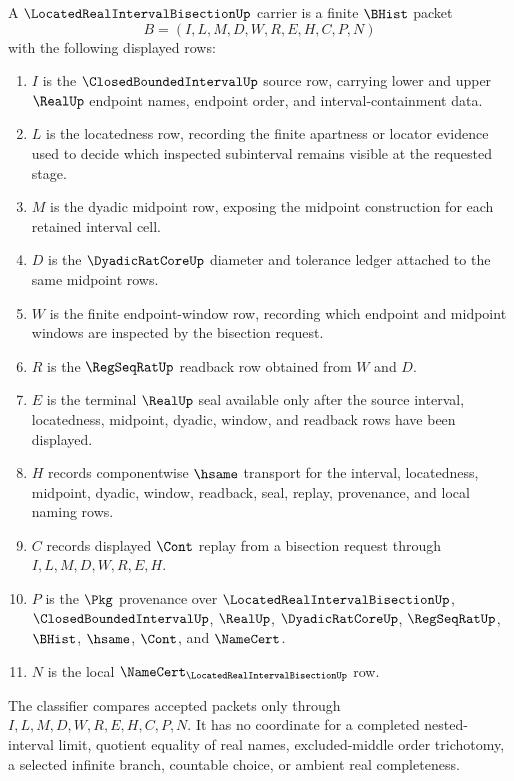 \begin{definition}
\label{def:located-real-interval-bisection-carrier}
A $\LocatedRealIntervalBisectionUp$ carrier is a finite $\BHist$ packet
$$
B=(I,L,M,D,W,R,E,H,C,P,N)
$$
with the following displayed rows:
\begin{enumerate}
\item $I$ is the $\ClosedBoundedIntervalUp$ source row, carrying lower and upper $\RealUp$ endpoint names, endpoint order, and interval-containment data.
\item $L$ is the locatedness row, recording the finite apartness or locator evidence used to decide which inspected subinterval remains visible at the requested stage.
\item $M$ is the dyadic midpoint row, exposing the midpoint construction for each retained interval cell.
\item $D$ is the $\DyadicRatCoreUp$ diameter and tolerance ledger attached to the same midpoint rows.
\item $W$ is the finite endpoint-window row, recording which endpoint and midpoint windows are inspected by the bisection request.
\item $R$ is the $\RegSeqRatUp$ readback row obtained from $W$ and $D$.
\item $E$ is the terminal $\RealUp$ seal available only after the source interval, locatedness, midpoint, dyadic, window, and readback rows have been displayed.
\item $H$ records componentwise $\hsame$ transport for the interval, locatedness, midpoint, dyadic, window, readback, seal, replay, provenance, and local naming rows.
\item $C$ records displayed $\Cont$ replay from a bisection request through $I,L,M,D,W,R,E,H$.
\item $P$ is the $\Pkg$ provenance over $\LocatedRealIntervalBisectionUp$, $\ClosedBoundedIntervalUp$, $\RealUp$, $\DyadicRatCoreUp$, $\RegSeqRatUp$, $\BHist$, $\hsame$, $\Cont$, and $\NameCert$.
\item $N$ is the local $\NameCert_{\LocatedRealIntervalBisectionUp}$ row.
\end{enumerate}
The classifier compares accepted packets only through $I,L,M,D,W,R,E,H,C,P,N$. It has no coordinate for a completed nested-interval limit, quotient equality of real names, excluded-middle order trichotomy, a selected infinite branch, countable choice, or ambient real completeness.
\end{definition}

